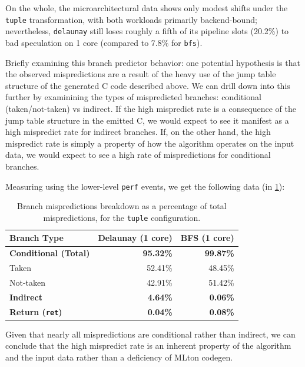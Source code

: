 On the whole, the microarchitectural data shows only modest shifts under the
\texttt{tuple} transformation, with both workloads primarily backend-bound;
nevertheless, \texttt{delaunay} still loses roughly a fifth of its pipeline
slots (20.2\%) to bad speculation on 1 core (compared to 7.8\% for \texttt{bfs}).

Briefly examining this branch predictor behavior: one potential hypothesis
is that the observed mispredictions are a result of the heavy use of the jump table
structure of the generated C code described above. We can drill down into this
further by examinining the types of mispredicted branches: conditional
(taken/not-taken) vs indirect. If the high mispredict rate is a consequence of
the jump table structure in the emitted C, we would expect to see it manifest as
a high mispredict rate for indirect branches. If, on the other hand, the high
mispredict rate is simply a property of how the algorithm operates on the input
data, we would expect to see a high rate of mispredictions for conditional
branches.

Measuring using the lower-level \texttt{perf} events, we get the following data
(in \cref{tab:badspec_hierarchical_tuple}):
\begin{table}[htbp]
  \centering
  \caption{Branch mispredictions breakdown as a percentage of total mispredictions, for the \texttt{tuple} configuration.}
  \label{tab:badspec_hierarchical_tuple}
  \begin{tabular}{lrr}
    \toprule
    \textbf{Branch Type} & \textbf{Delaunay (1 core)} & \textbf{BFS (1 core)} \\
    \midrule
    \textbf{Conditional (Total)} & \textbf{95.32\%} & \textbf{99.87\%} \\
    \quad Taken                  & 52.41\%          & 48.45\%          \\
    \quad Not-taken              & 42.91\%          & 51.42\%          \\
    \textbf{Indirect}            &  \textbf{4.64\%} &  \textbf{0.06\%} \\
    \textbf{Return (\texttt{ret})}& \textbf{0.04\%} &  \textbf{0.08\%} \\
    \bottomrule
  \end{tabular}
\end{table}
Given that nearly all mispredictions are conditional rather than indirect, we
can conclude that the high mispredict rate is an inherent property of the
algorithm and the input data rather than a deficiency of MLton codegen.


